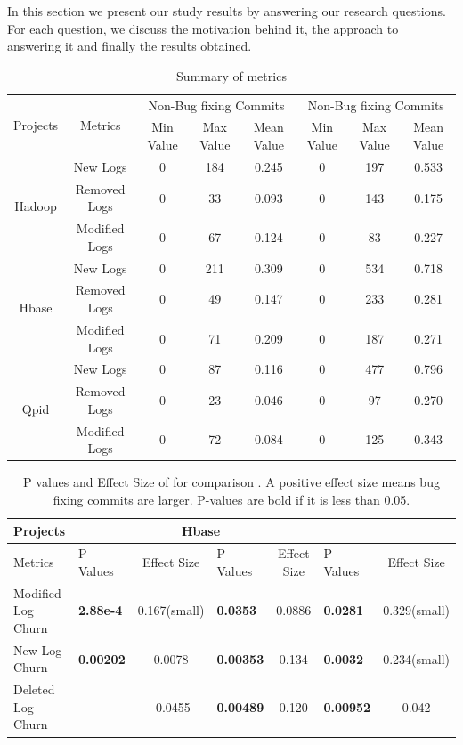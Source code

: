 
In this section we present our study results by answering our research questions. For each question, we discuss the motivation behind it, the approach to answering it and finally the results obtained.

\begin{table}
	\caption{Summary of metrics}
	\label{tab:bla}
	\centering{}%
	\begin{tabular}{|c|c|c|c|c|c|c|c|}
		\hline 
		\multirow{2}{*}{Projects} & \multirow{2}{*}{Metrics} & \multicolumn{3}{c|}{Non-Bug fixing Commits} & \multicolumn{3}{c|}{Non-Bug fixing Commits}\tabularnewline
		\cline{3-8} 
		&  & Min Value & Max Value & Mean Value & Min Value & Max Value & Mean Value\tabularnewline
		\hline 
		\multirow{3}{*}{Hadoop} & New Logs & 0 & 184 & 0.245 & 0 & 197 & 0.533\tabularnewline
		\cline{2-8} 
		& Removed Logs & 0 & 33 & 0.093 & 0 & 143 & 0.175\tabularnewline
		\cline{2-8} 
		& Modified Logs & 0 & 67 & 0.124 & 0 & 83 & 0.227\tabularnewline
		\hline 
		\multirow{3}{*}{Hbase} & New Logs & 0 & 211 & 0.309 & 0 & 534 & 0.718\tabularnewline
		\cline{2-8} 
		& Removed Logs & 0 & 49 & 0.147 & 0 & 233 & 0.281\tabularnewline
		\cline{2-8} 
		& Modified Logs & 0 & 71 & 0.209 & 0 & 187 & 0.271\tabularnewline
		\hline 
		\multirow{3}{*}{Qpid} & New Logs & 0 & 87 & 0.116 & 0 & 477 & 0.796\tabularnewline
		\cline{2-8} 
		& Removed Logs & 0 & 23 & 0.046 & 0 & 97 & 0.270\tabularnewline
		\cline{2-8} 
		& Modified Logs & 0 & 72 & 0.084 & 0 & 125 & 0.343\tabularnewline
		\hline 
	\end{tabular}
\end{table}



\begin{table}[t]
	\caption{P values and Effect Size of for comparison	. A positive effect size means bug fixing commits are larger. P-values are bold if it is less than 0.05.}
	\label{tab:logchange}
	\centering{}%
	\begin{tabular}{|>{\centering}m{4.1cm}|>{\centering}m{1.5cm}|c|>{\centering}p{1.5cm}|c|>{\centering}p{1.5cm}|c|}
		\hline 
		Projects & \multicolumn{2}{c|}{Hadoop} & \multicolumn{2}{c|}{Hbase} & \multicolumn{2}{c|}{Qpid}\tabularnewline
		\hline 
		Metrics & P-Values & Effect Size & P-Values & Effect Size & P-Values & Effect Size\tabularnewline
		\hline 
		Modified Log Churn  & \textbf{2.88e-4} & 0.167(small) & \textbf{0.0353} & 0.0886 & \textbf{0.0281} & 0.329(small)\tabularnewline
		\hline 
		New Log Churn & \textbf{0.00202} & 0.0078 & \textbf{0.00353} & 0.134 & \textbf{0.0032} & 0.234(small)\tabularnewline
		\hline 
		Deleted Log Churn & 0.087 & -0.0455 & \textbf{0.00489} & 0.120 & \textbf{0.00952} & 0.042\tabularnewline
		\hline 
	\end{tabular}
	
\end{table}



